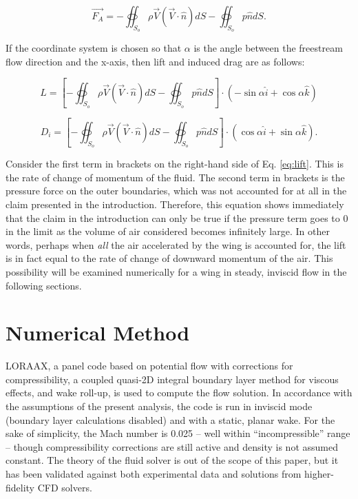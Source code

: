 \documentclass[11pt]{article}
\begin{document}
\begin{equation}
\vec{F_A} = -\oiint_{S_o}\rho\vec{V}(\vec{V}\cdot\hat{n})dS
          - \oiint_{S_o}p\hat{n}dS.
\label{eq:2nd_law4}
\end{equation}

If the coordinate system is chosen so that $\alpha$ is the angle between the
freestream flow direction and the x-axis, then lift and induced drag are as
follows:

\begin{equation}
L = \left[-\oiint_{S_o}\rho\vec{V}(\vec{V}\cdot\hat{n})dS -
           \oiint_{S_o}p\hat{n}dS\right]
    \cdot(-\sin\alpha\hat{i} + \cos\alpha\hat{k})
\label{eq:lift}
\end{equation}

\begin{equation}
D_i = \left[-\oiint_{S_o}\rho\vec{V}(\vec{V}\cdot\hat{n})dS -
             \oiint_{S_o}p\hat{n}dS\right]
      \cdot(\cos\alpha\hat{i} + \sin\alpha\hat{k}).
\label{eq:induced_drag}
\end{equation}

Consider the first term in brackets on the right-hand side of Eq. \ref{eq:lift}.
This is the rate of change of momentum of the fluid. The second term in
brackets is the pressure force on the outer boundaries, which was not accounted
for at all in the claim presented in the introduction. Therefore, this equation
shows immediately that the claim in the introduction can only be true if the
pressure term goes to 0 in the limit as the volume of air considered becomes
infinitely large. In other words, perhaps when \textit{all} the air
accelerated by the wing is accounted for, the lift is in fact equal to the rate
of change of downward momentum of the air. This possibility will be examined
numerically for a wing in steady, inviscid flow in the following sections.

\section{Numerical Method}

LORAAX, a panel code based on potential flow with corrections for
compressibility, a coupled quasi-2D integral boundary layer method for viscous
effects, and wake roll-up, is used to compute the flow solution. In accordance
with the assumptions of the present analysis, the code is run in inviscid mode
(boundary layer
calculations disabled) and with a static, planar wake. For the sake of
simplicity, the Mach number is 0.025 -- well within ``incompressible'' range --
though compressibility corrections are
still active and density is not assumed constant. The  theory of the fluid
solver is out of the scope of this paper, but it has been validated against both
experimental data and solutions from higher-fidelity CFD solvers.
\end{document}
